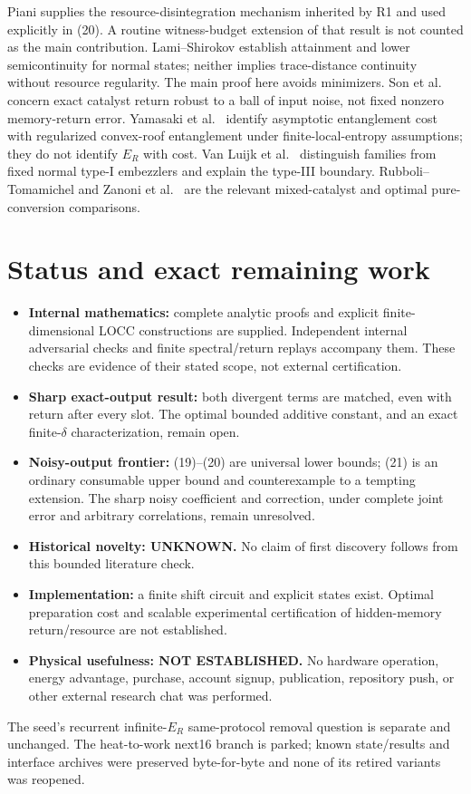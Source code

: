 \documentclass[11pt,a4paper]{article}
\newcommand{\ER}{E_R}
\begin{document}
Piani \cite{piani} supplies the resource-disintegration mechanism inherited by
R1 and used explicitly in (20). A routine witness-budget extension of that
result is not counted as the main contribution.
Lami--Shirokov \cite{lami} establish attainment and lower semicontinuity for
normal states; neither implies trace-distance continuity without resource
regularity. The main proof here avoids minimizers.
Son et al.\ \cite{son} concern exact catalyst return robust to a ball of input
noise, not fixed nonzero memory-return error.
Yamasaki et al.\ \cite{yamasaki} identify asymptotic entanglement cost with
regularized convex-roof entanglement under finite-local-entropy assumptions;
they do not identify \(\ER\) with cost.
Van Luijk et al.\ \cite{vluijk} distinguish families from fixed normal
type-I embezzlers and explain the type-III boundary.
Rubboli--Tomamichel \cite{rubboli} and Zanoni et al.\ \cite{zanoni}
are the relevant mixed-catalyst and optimal pure-conversion comparisons.

\section{Status and exact remaining work}
\begin{itemize}
 \item \textbf{Internal mathematics:} complete analytic proofs and explicit
 finite-dimensional LOCC constructions are supplied. Independent internal
 adversarial checks and finite spectral/return replays accompany them.
 These checks are evidence of their stated scope, not external certification.
 \item \textbf{Sharp exact-output result:} both divergent terms are matched,
 even with return after every slot. The optimal bounded additive constant,
 and an exact finite-\(\delta\) characterization, remain open.
 \item \textbf{Noisy-output frontier:} (19)--(20) are universal lower bounds;
 (21) is an ordinary consumable upper bound and counterexample to a tempting
 extension. The sharp noisy coefficient and correction, under complete joint
 error and arbitrary correlations, remain unresolved.
 \item \textbf{Historical novelty: UNKNOWN.}
 No claim of first discovery follows from this bounded literature check.
 \item \textbf{Implementation:} a finite shift circuit and explicit states
 exist. Optimal preparation cost and scalable experimental certification of
 hidden-memory return/resource are not established.
 \item \textbf{Physical usefulness: NOT ESTABLISHED.}
 No hardware operation, energy advantage, purchase, account signup,
 publication, repository push, or other external research chat was performed.
\end{itemize}
The seed's recurrent infinite-\(\ER\) same-protocol removal question is separate
and unchanged. The heat-to-work next16 branch is parked; known state/results
and interface archives were preserved byte-for-byte and none of its retired
variants was reopened.
\end{document}
